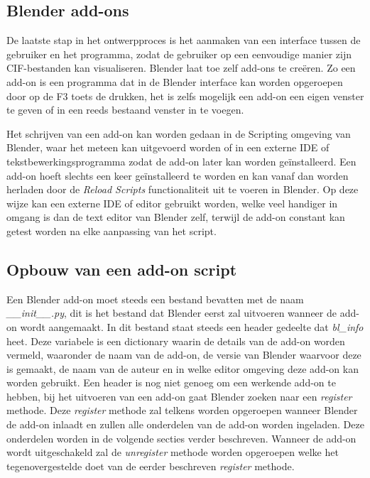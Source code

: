 \subsection{Blender add-ons}
De laatste stap in het ontwerpproces is het aanmaken van een interface tussen de gebruiker en het programma, zodat de gebruiker op een eenvoudige manier zijn CIF-bestanden kan visualiseren. Blender laat toe zelf add-ons te creëren. Zo een add-on is een programma dat in de Blender interface kan worden opgeroepen door op de F3 toets de drukken, het is zelfs mogelijk een add-on een eigen venster te geven of in een reeds bestaand venster in te voegen.
\par
Het schrijven van een add-on kan worden gedaan in de Scripting omgeving van Blender, waar het meteen kan uitgevoerd worden of in een externe IDE of tekstbewerkingsprogramma zodat de add-on later kan worden geïnstalleerd. Een add-on hoeft slechts een keer geïnstalleerd te worden en kan vanaf dan worden herladen door de \textit{Reload Scripts} functionaliteit uit te voeren in Blender. Op deze wijze kan een externe IDE of editor gebruikt worden, welke veel handiger in omgang is dan de text editor van Blender zelf, terwijl de add-on constant kan getest worden na elke aanpassing van het script.

\subsection{Opbouw van een add-on script}
Een Blender add-on moet steeds een bestand bevatten met de naam \textit{\_\_init\_\_.py}, dit is het bestand dat Blender eerst zal uitvoeren wanneer de add-on wordt aangemaakt. In dit bestand staat steeds een header gedeelte dat \textit{bl\_info} heet. Deze variabele is een dictionary waarin de details van de add-on worden vermeld, waaronder de naam van de add-on, de versie van Blender waarvoor deze is gemaakt, de naam van de auteur en in welke editor omgeving deze add-on kan worden gebruikt. Een header is nog niet genoeg om een werkende add-on te hebben, bij het uitvoeren van een add-on gaat Blender zoeken naar een \textit{register} methode. Deze \textit{register} methode zal telkens worden opgeroepen wanneer Blender de add-on inlaadt en zullen alle onderdelen van de add-on worden ingeladen. Deze onderdelen worden in de volgende secties verder beschreven. Wanneer de add-on wordt uitgeschakeld zal de \textit{unregister} methode worden opgeroepen welke het tegenovergestelde doet van de eerder beschreven \textit{register} methode.
\par
